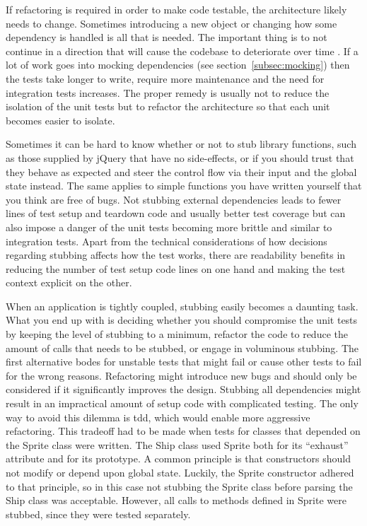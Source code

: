 \documentclass[11pt]{article}
\begin{document}
If refactoring is required in order to make code testable, the architecture likely needs to change. Sometimes introducing a new object or changing how some dependency is handled is all that is needed. The important thing is to not continue in a direction that will cause the codebase to deteriorate over time \cite[question~34]{Stenmark}. If a lot of work goes into mocking dependencies (see section~\ref{subsec:mocking}) then the tests take longer to write, require more maintenance and the need for integration tests increases. The proper remedy is usually not to reduce the isolation of the unit tests but to refactor the architecture so that each unit becomes easier to isolate. \cite[question~42]{Stenmark}

Sometimes it can be hard to know whether or not to stub library functions, such as those supplied by jQuery that have no side-effects, or if you should trust that they behave as expected and steer the control flow via their input and the global state instead. The same applies to simple functions you have written yourself that you think are free of bugs. Not stubbing external dependencies leads to fewer lines of test setup and teardown code and usually better test coverage but can also impose a danger of the unit tests becoming more brittle and similar to integration tests. Apart from the technical considerations of how decisions regarding stubbing affects how the test works, there are readability benefits in reducing the number of test setup code lines on one hand and making the test context explicit on the other.

When an application is tightly coupled, stubbing easily becomes a daunting task. What you end up with is deciding whether you should compromise the unit tests by keeping the level of stubbing to a minimum, refactor the code to reduce the amount of calls that needs to be stubbed, or engage in voluminous stubbing. The first alternative bodes for unstable tests that might fail or cause other tests to fail for the wrong reasons. Refactoring might introduce new bugs and should only be considered if it significantly improves the design. Stubbing all dependencies might result in an impractical amount of setup code with complicated testing. The only way to avoid this dilemma is \gls{tdd}, which would enable more aggressive refactoring. This tradeoff had to be made when tests for classes that depended on the Sprite class were written. The Ship class used Sprite both for its ``exhaust'' attribute and for its prototype. A common principle is that constructors should not modify or depend upon global state. Luckily, the Sprite constructor adhered to that principle, so in this case not stubbing the Sprite class before parsing the Ship class was acceptable. However, all calls to methods defined in Sprite were stubbed, since they were tested separately.
\end{document}
